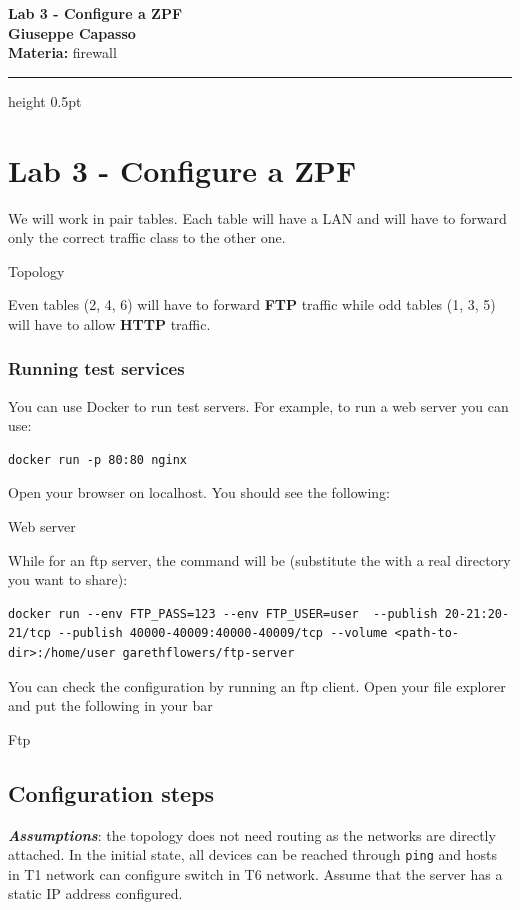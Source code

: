 \documentclass[11pt,a4paper]{article}
\newcommand{\proposaltitle}[1]{
    \begin{center}
        \vspace*{0.1cm}
        {\LARGE \bfseries \color{blue} #1} \\[1.5ex]
        {\large \textbf{Giuseppe Capasso}} \\[1ex]
                \small{
            \vspace{0.1cm}
            \textbf{Materia:} firewall\\
        }
            \end{center}
    \vspace{0.3cm}
    \hrule height 0.5pt
    \vspace{0.5cm}
}
\begin{document}
\proposaltitle{Lab 3 - Configure a ZPF}

\section{Lab 3 - Configure a ZPF}\label{lab-3---configure-a-zpf}

We will work in pair tables. Each table will have a LAN and will have to
forward only the correct traffic class to the other one.

Topology

Even tables (2, 4, 6) will have to forward \textbf{FTP} traffic while
odd tables (1, 3, 5) will have to allow \textbf{HTTP} traffic.

\subsubsection{Running test services}\label{running-test-services}

You can use Docker to run test servers. For example, to run a web server
you can use:

\begin{verbatim}
docker run -p 80:80 nginx
\end{verbatim}

Open your browser on localhost. You should see the following:

Web server

While for an ftp server, the command will be (substitute the with a real
directory you want to share):

\begin{verbatim}
docker run --env FTP_PASS=123 --env FTP_USER=user  --publish 20-21:20-21/tcp --publish 40000-40009:40000-40009/tcp --volume <path-to-dir>:/home/user garethflowers/ftp-server
\end{verbatim}

You can check the configuration by running an ftp client. Open your file
explorer and put the following in your bar

Ftp

\subsection{Configuration steps}\label{configuration-steps}

\textbf{\emph{Assumptions}}: the topology does not need routing as the
networks are directly attached. In the initial state, all devices can be
reached through \texttt{ping} and hosts in T1 network can configure
switch in T6 network. Assume that the server has a static IP address
configured.
\end{document}
